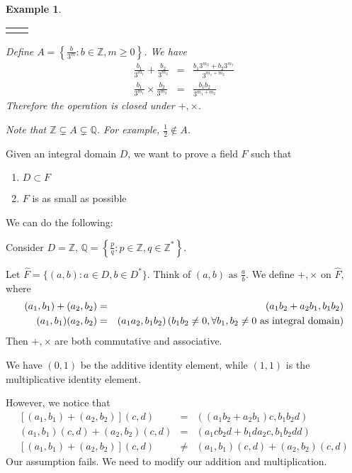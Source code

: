 \documentclass{article}
\theoremstyle{MyNonumberplain}
\theoremstyle{break}
\newcommand{\nline}{\begin{tabular}{ll}&\\\end{tabular}}
\newcommand{\nin}{\not\in}
\theoremstyle{break}
\newtheorem{example}{Example}[section]
\theoremstyle{break}
\theoremstyle{definition}
\theoremstyle{break}
\begin{document}
\begin{expbox}
    \begin{example} 

        \nline

        Define $A = \left\{ \frac{b}{3^m} : b \in \mathbb{Z}, m \geq 0 \right\}$. We
        have
        \begin{eqnarray*}
        \frac{b_1}{3^{m_1}} + \frac{b_2}{3^{m_2}} & = & \frac{b_1 3^{m_2} + b_2
        3^{m_1}}{3^{m_1 + m_2}}\\
        \frac{b_1}{3^{m_1}} \times \frac{b_2}{3^{m_2}} & = & \frac{b_1 b_2}{3^{m_1 +
        m_2}}
        \end{eqnarray*}
        Therefore the operation is closed under $+, \times$.\bigskip

        Note that $\mathbb{Z} \subsetneq A \subsetneq \mathbb{Q}$. For example,
        $\frac{1}{2} \nin A$.
    \end{example}
\end{expbox}

Given an integral domain $D$, we want to prove a field $F$ such that
\begin{enumerate}
  \item $D \subset F$
  
  \item $F$ is as small as possible
\end{enumerate}
We can do the following:

Consider $D =\mathbb{Z}$, $\mathbb{Q}= \left\{ \frac{p}{q} : p \in \mathbb{Z},
q \in \mathbb{Z}^{\ast} \right\}$.

Let $\hat{F} = \{ (a, b) : a \in D, b \in D^{\ast} \}$. Think of $(a, b)
\text{ as } \frac{a}{b}$. We define $+, \times$ on $\hat{F}$, where
\begin{eqnarray*}
  (a_1, b_1) + (a_2, b_2) & = & (a_1 b_2 + a_2 b_1, b_1 b_2)\\
  (a_1, b_1) (a_2, b_2) & = & (a_1 a_2, b_1 b_2) \hspace*{\fill} \left( b_1
  b_2 \neq 0, \forall b_1, b_2 \neq 0 \text{ as integral domain} \right)
\end{eqnarray*}
Then $+, \times$ are both commutative and associative.

We have $(0, 1)$ be the additive identity element, while $(1, 1)$ is the multiplicative identity element.

However, we notice that
\begin{eqnarray*}
  {}[(a_1, b_1) + (a_2, b_2)] (c, d) & = & ((a_1 b_2 + a_2 b_1) c, b_1 b_2
  d)\\
  (a_1, b_1) (c, d) + (a_2, b_2) (c, d) & = & (a_1 c b_2 d + b_1 d a_2 c, b_1
  b_2 d d)\\
  {}[(a_1, b_1) + (a_2, b_2)] (c, d) & \neq & (a_1, b_1) (c, d) + (a_2, b_2)
  (c, d)
\end{eqnarray*}
Our assumption fails. We need to modify our addition and multiplication.
\end{document}
